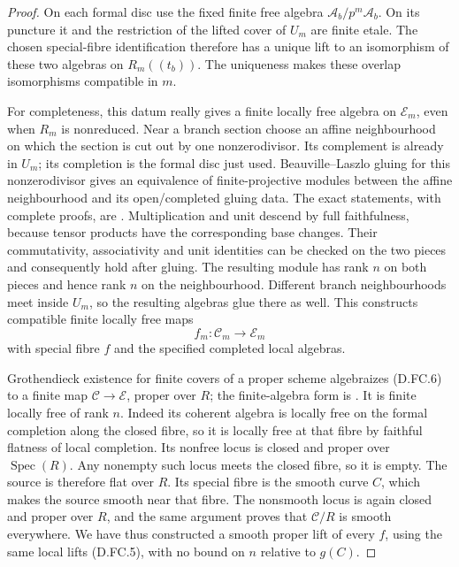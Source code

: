 \begin{proof}
On each formal disc use the fixed finite free algebra
$\mathcal A_b/p^m\mathcal A_b$. On its puncture it and the
restriction of the lifted cover of $U_m$ are finite etale.
The chosen special-fibre identification therefore has a unique
lift to an isomorphism of these two algebras on
$R_m((t_b))$. The uniqueness makes these overlap isomorphisms
compatible in $m$.

For completeness, this datum really gives a finite locally free
algebra on $\mathcal E_m$, even when $R_m$ is nonreduced.
Near a branch section choose an affine neighbourhood on which
the section is cut out by one nonzerodivisor. Its complement is
already in $U_m$; its completion is the formal disc just used.
Beauville--Laszlo gluing for this nonzerodivisor gives an
equivalence of finite-projective modules between the affine
neighbourhood and its open/completed gluing data. The exact
statements, with complete proofs, are
\citet[Tag 0BP2 and Tag 0BNI, Theorem 15.92.16 and
Lemmas 15.92.18--19]{StacksFormalCurveB}.
Multiplication and unit descend by full faithfulness, because
tensor products have the corresponding base changes. Their
commutativity, associativity and unit identities can be checked
on the two pieces and consequently hold after gluing. The
resulting module has rank $n$ on both pieces and hence rank $n$
on the neighbourhood. Different branch neighbourhoods meet
inside $U_m$, so the resulting algebras glue there as well.
This constructs compatible finite locally free maps
\[
                     f_m:\mathcal C_m\longrightarrow\mathcal E_m
                                                               \tag{D.FC.6}
\]
with special fibre $f$ and the specified completed local algebras.

Grothendieck existence for finite covers of a proper scheme
algebraizes (D.FC.6) to a finite map
$\mathcal C\to\mathcal E$, proper over $R$; the finite-algebra
form is \citet[Tag 09ZT, Lemma 30.28.2]{StacksFormalCurveB}.
It is finite locally free of rank $n$. Indeed its coherent algebra
is locally free on the formal completion along the closed fibre,
so it is locally free at that fibre by faithful flatness of local
completion. Its nonfree locus is closed and proper over
$\operatorname{Spec}(R)$. Any nonempty such locus meets the closed
fibre, so it is empty. The source is therefore flat over $R$.
Its special fibre is the smooth curve $C$, which makes the
source smooth near that fibre. The nonsmooth locus is again
closed and proper over $R$, and the same argument proves that
$\mathcal C/R$ is smooth everywhere. We have thus constructed
a smooth proper lift of every $f$, using the same local lifts
(D.FC.5), with no bound on $n$ relative to $g(C)$.


\end{proof}

